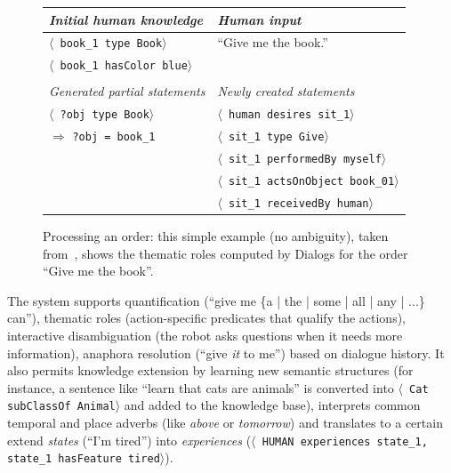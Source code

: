 \documentclass[preprint,3p,times]{elsarticle}
\newcommand{\concept}[1]{{\small \texttt{#1}}}
\newcommand{\stmt}[1]{{\footnotesize \tt $\langle$ #1\relax$\rangle$}}
\begin{document}
\begin{figure}
    \centering
	\begin{tabular}{l|l}
	\emph{Initial human knowledge} &
	\emph{Human input}\\
	
	\hline
	
    	\stmt{book\_1 type Book} &
	``Give me the book.'' \\
	
    	\stmt{book\_1 hasColor blue} & \\
	\vspace{0.5em}\\
	\hline
    	
	\emph{Generated partial statements} &
	\emph{Newly created statements}\\
	\hline
    	\stmt{?obj type Book} & 
	\stmt{human desires sit\_1} \\
	
	\hspace{0.2cm}$\Rightarrow$ \concept{?obj = book\_1}
    	& \stmt{sit\_1 type Give} \\
    	& \stmt{sit\_1 performedBy myself} \\
    	& \stmt{sit\_1 actsOnObject book\_01} \\
    	& \stmt{sit\_1 receivedBy human} \\
	\end{tabular}

    \caption{Processing an order: this simple example (no ambiguity), taken
    from~\cite{Lemaignan2011a}, shows the thematic roles computed by {\sc
Dialogs} for the order ``Give me the book''.}

\label{dialogs|ex}
\end{figure}


The system supports quantification (``give me \{a | the | some | all | any |
...\} can''), thematic roles (action-specific predicates that qualify the
actions), interactive disambiguation (the robot asks questions when it needs
more information), anaphora resolution (``give \emph{it} to me'') based on
dialogue history. It also permits knowledge extension by learning new semantic
structures (for instance, a sentence like ``learn that cats are animals'' is
converted into \stmt{Cat subClassOf Animal} and added to the knowledge base),
interprets common temporal and place adverbs (like \emph{above} or
\emph{tomorrow}) and translates to a certain extend \emph{states} (``I'm
tired'') into \emph{experiences} (\stmt{HUMAN experiences state\_1, state\_1
hasFeature tired}).
\end{document}
